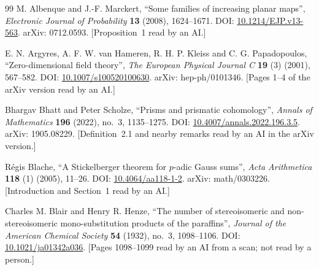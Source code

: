\documentclass[11pt]{article}
\theoremstyle{definition}
\theoremstyle{remark}
\numberwithin{equation}{section}
\numberwithin{figure}{section}
\begin{document}
\begin{thebibliography}{99}\small
{}
M. Albenque and J.-F. Marckert, ``Some families of increasing planar maps'', \emph{Electronic Journal of
Probability} \textbf{13} (2008), 1624--1671. DOI: \href{https://doi.org/10.1214/EJP.v13-563}{10.1214/EJP.v13-563}.
arXiv: 0712.0593. [Proposition~1 read by an AI.]

E. N. Argyres, A. F. W. van Hameren, R. H. P. Kleiss and C. G. Papadopoulos, ``Zero-dimensional field theory'',
\emph{The European Physical Journal C} \textbf{19} (3) (2001), 567--582. DOI:
\href{https://doi.org/10.1007/s100520100630}{10.1007/s100520100630}. arXiv: hep-ph/0101346. [Pages 1--4 of the
arXiv version read by an AI.]

Bhargav Bhatt and Peter Scholze, ``Prisms and prismatic cohomology'', \emph{Annals of Mathematics}
\textbf{196} (2022), no.~3, 1135--1275. DOI:
\href{https://doi.org/10.4007/annals.2022.196.3.5}{10.4007/annals.2022.196.3.5}. arXiv: 1905.08229.
[Definition~2.1 and nearby remarks read by an AI in the arXiv version.]

R\'egis Blache, ``A Stickelberger theorem for $p$-adic Gauss sums'', \emph{Acta Arithmetica} \textbf{118} (1)
(2005), 11--26. DOI: \href{https://doi.org/10.4064/aa118-1-2}{10.4064/aa118-1-2}. arXiv: math/0303226.
[Introduction and Section~1 read by an AI.]

Charles M. Blair and Henry R. Henze, ``The number of stereoisomeric and non-stereoisomeric mono-substitution
products of the paraffins'', \emph{Journal of the American Chemical Society} \textbf{54} (1932), no.~3,
1098--1106. DOI: \href{https://doi.org/10.1021/ja01342a036}{10.1021/ja01342a036}. [Pages 1098--1099 read by
an AI from a scan; not read by a person.]


\end{thebibliography}
\end{document}
